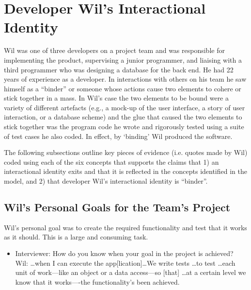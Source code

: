 \documentclass{chi2009}
\begin{document}
\section{Developer Wil's Interactional Identity}

Wil was one of three developers on a project team and was responsible for implementing the product, supervising a junior programmer, and liaising with a third programmer who was designing a database for the back end. He had 22 years of experience as a developer. In interactions with others on his team he saw himself as a ``binder'' or someone whose actions cause two elements to cohere or stick together in a mass. In Wil's case the two elements to be bound were a variety of different artefacts (e.g., a mock-up of the user interface, a story of user interaction, or a database scheme) and the glue that caused the two elements to stick together was the program code he wrote and rigorously tested using a suite of test cases he also coded. In effect, by `binding' Wil produced the software. 

The following subsections outline key pieces of evidence (i.e. quotes made by Wil) coded using each of the six concepts that supports the claims that 1) an interactional identity exits and that it is reflected in the concepts identified in the model, and 2) that developer Wil's interactional identity is ``binder''. 

\subsection{Wil's Personal Goals for the Team's Project} 
Wil's personal goal was to create the required functionality and test that it works as it should. This is a large and consuming task. 
\begin{itemize} 
\item [] Interviewer: How do you know when your goal in the project is achieved? \\
Wil: \dots when I can execute the app[lication]\dots We write tests \dots to test \ldots each unit of work---like an object or a data access---so [that] \ldots at a certain level we know that it works----the functionality's been achieved. 
\end{itemize}
\end{document}
